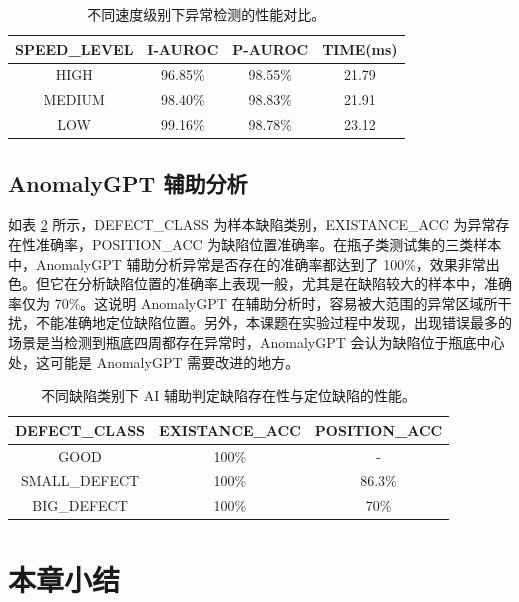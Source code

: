 \documentclass[
  ]{njuthesis}
\begin{document}
\begin{table}[H]
    \centering
    \caption{不同速度级别下异常检测的性能对比。}
    \label{speed_level_comparison}
    \renewcommand\arraystretch{0.5}
    \begin{tabular}{c|c|c|c}
    \toprule[1.5pt]
    SPEED\_LEVEL & I-AUROC & P-AUROC & TIME(ms) \\
    \midrule[1pt]
    HIGH & 96.85\% & 98.55\% & 21.79 \\
    \midrule[0.5pt]
    MEDIUM & 98.40\% & 98.83\% & 21.91 \\
    \midrule[0.5pt]
    LOW & 99.16\% & 98.78\% & 23.12 \\
    \bottomrule[1.5pt]
    \end{tabular}
\end{table}


\subsection{AnomalyGPT 辅助分析}

如表 \ref{AI_detection_accuracy} 所示，DEFECT\_CLASS 为样本缺陷类别，EXISTANCE\_ACC 为异常存在性准确率，POSITION\_ACC 为缺陷位置准确率。在瓶子类测试集的三类样本中，AnomalyGPT 辅助分析异常是否存在的准确率都达到了 100\%，效果非常出色。但它在分析缺陷位置的准确率上表现一般，尤其是在缺陷较大的样本中，准确率仅为 70\%。这说明 AnomalyGPT 在辅助分析时，容易被大范围的异常区域所干扰，不能准确地定位缺陷位置。另外，本课题在实验过程中发现，出现错误最多的场景是当检测到瓶底四周都存在异常时，AnomalyGPT 会认为缺陷位于瓶底中心处，这可能是 AnomalyGPT 需要改进的地方。

\begin{table}[H]
    \centering
    \caption{不同缺陷类别下 AI 辅助判定缺陷存在性与定位缺陷的性能。}
    \label{AI_detection_accuracy}
    \renewcommand\arraystretch{0.5}
    \begin{tabular}{c|c|c}
    \toprule[1.5pt]
    DEFECT\_CLASS & EXISTANCE\_ACC & POSITION\_ACC \\
    \midrule[1pt]
    GOOD & 100\% & - \\
    \midrule[0.5pt]
    SMALL\_DEFECT & 100\% & 86.3\% \\
    \midrule[0.5pt]
    BIG\_DEFECT & 100\% & 70\% \\
    \bottomrule[1.5pt]
    \end{tabular}
\end{table}

\section{本章小结}
\end{document}

